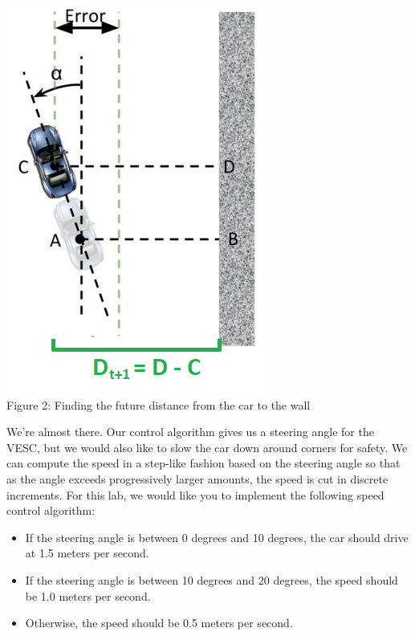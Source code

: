 \documentclass[letta4 paper]{article}
\numberwithin{equation}{section}
\newcommand{\0}{\mathbf{0}}
\begin{document}
	\begin{center}
		\includegraphics[scale=0.75]{wall_following_lab_figure_2.png}\\
		\label{fig:fig2}
		Figure 2: Finding the future distance from the car to the wall
	\end{center}
	
	We're almost there. Our control algorithm gives us a steering angle for the VESC, but we would also like to slow the car down around corners for safety. We can compute the speed in a step-like fashion based on the steering angle so that as the angle exceeds progressively larger amounts, the speed is cut in discrete increments. For this lab, we would like you to implement the following speed control algorithm:
	\begin{itemize}
		\item If the steering angle is between 0 degrees and 10 degrees, the car should drive at 1.5 meters per second.
		\item If the steering angle is between 10 degrees and 20 degrees, the speed should be 1.0 meters per second.
		\item Otherwise, the speed should be 0.5 meters per second.
	\end{itemize}
	
\end{document}
